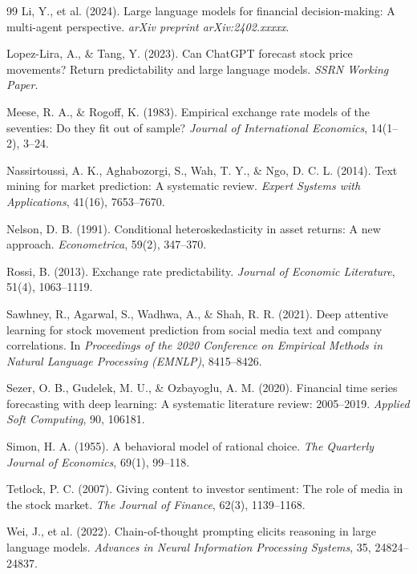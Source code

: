 \documentclass[11pt,a4paper]{article}
\begin{document}
\begin{thebibliography}{99}
Li, Y., et al. (2024).
Large language models for financial decision-making: A multi-agent perspective.
\textit{arXiv preprint arXiv:2402.xxxxx}.

Lopez-Lira, A., \& Tang, Y. (2023).
Can ChatGPT forecast stock price movements? Return predictability and large language models.
\textit{SSRN Working Paper}.

Meese, R. A., \& Rogoff, K. (1983).
Empirical exchange rate models of the seventies: Do they fit out of sample?
\textit{Journal of International Economics}, 14(1--2), 3--24.

Nassirtoussi, A. K., Aghabozorgi, S., Wah, T. Y., \& Ngo, D. C. L. (2014).
Text mining for market prediction: A systematic review.
\textit{Expert Systems with Applications}, 41(16), 7653--7670.

Nelson, D. B. (1991).
Conditional heteroskedasticity in asset returns: A new approach.
\textit{Econometrica}, 59(2), 347--370.

Rossi, B. (2013).
Exchange rate predictability.
\textit{Journal of Economic Literature}, 51(4), 1063--1119.

Sawhney, R., Agarwal, S., Wadhwa, A., \& Shah, R. R. (2021).
Deep attentive learning for stock movement prediction from social media text and company correlations.
In \textit{Proceedings of the 2020 Conference on Empirical Methods in Natural Language Processing (EMNLP)}, 8415--8426.

Sezer, O. B., Gudelek, M. U., \& Ozbayoglu, A. M. (2020).
Financial time series forecasting with deep learning: A systematic literature review: 2005--2019.
\textit{Applied Soft Computing}, 90, 106181.

Simon, H. A. (1955).
A behavioral model of rational choice.
\textit{The Quarterly Journal of Economics}, 69(1), 99--118.

Tetlock, P. C. (2007).
Giving content to investor sentiment: The role of media in the stock market.
\textit{The Journal of Finance}, 62(3), 1139--1168.

Wei, J., et al. (2022).
Chain-of-thought prompting elicits reasoning in large language models.
\textit{Advances in Neural Information Processing Systems}, 35, 24824--24837.


\end{thebibliography}
\end{document}
